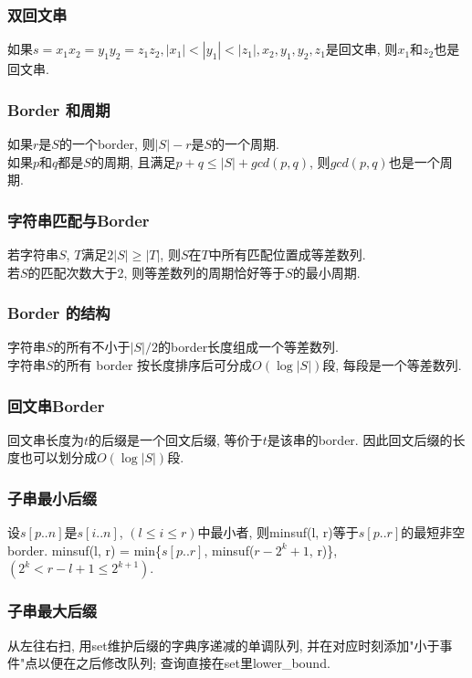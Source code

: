 \subsubsection*{双回文串}
\noindent
如果$s=x_1x_2=y_1y_2=z_1z_2, |x_1|<|y_1|<|z_1|, x_2, y_1, y_2, z_1$是回文串, 则$x_1$和$z_2$也是回文串. 

\subsubsection*{Border 和周期}
\noindent
如果$r$是$S$的一个border, 则$|S|-r$是$S$的一个周期.\\
如果$p$和$q$都是$S$的周期, 且满足$p+q\le |S|+gcd(p,q)$, 则$gcd(p,q)$也是一个周期.

\subsubsection*{字符串匹配与Border}
\noindent
若字符串$S$, $T$满足$2|S|\ge |T|$, 则$S$在$T$中所有匹配位置成等差数列.\\
若$S$的匹配次数大于2, 则等差数列的周期恰好等于$S$的最小周期.

\subsubsection*{Border 的结构}
\noindent
字符串$S$的所有不小于$|S|/2$的border长度组成一个等差数列.\\
字符串$S$的所有 border 按长度排序后可分成$O(\log{|S|})$段, 每段是一个等差数列. 

\subsubsection*{回文串Border}
\noindent
回文串长度为$t$的后缀是一个回文后缀, 等价于$t$是该串的border. 因此回文后缀的长度也可以划分成$O(\log{|S|})$段.

\subsubsection*{子串最小后缀}
\noindent
设$s[p..n]$是$s[i..n]$, $(l \leq i \leq r)$中最小者, 则minsuf(l, r)等于$s[p..r]$的最短非空 border. minsuf(l, r) = min\{$s[p..r]$, minsuf($r - 2^k + 1$, r)\}, $(2^k < r - l + 1 \leq 2^{k+1})$.

\subsubsection*{子串最大后缀}
\noindent
从左往右扫, 用set维护后缀的字典序递减的单调队列, 并在对应时刻添加"小于事件"点以便在之后修改队列; 查询直接在set里lower\_bound. 

